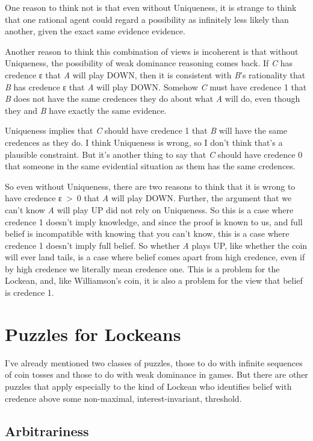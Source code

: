 \documentclass[
  10pt,
  letterpaper,
  twoside]{scrbook}
\begin{document}
One reason to think not is that even without Uniqueness, it is strange
to think that one rational agent could regard a possibility as
infinitely less likely than another, given the exact same evidence
evidence.

Another reason to think this combination of views is incoherent is that
without Uniqueness, the possibility of weak dominance reasoning comes
back. If \emph{C} has credence ε that \emph{A} will play DOWN, then it
is consistent with \emph{B}'s rationality that \emph{B} has credence ε
that \emph{A} will play DOWN. Somehow \emph{C} must have credence 1 that
\emph{B} does not have the same credences they do about what \emph{A}
will do, even though they and \emph{B} have exactly the same evidence.

Uniqueness implies that \emph{C} should have credence 1 that \emph{B}
will have the same credences as they do. I think Uniqueness is wrong, so
I don't think that's a plausible constraint. But it's another thing to
say that \emph{C} should have credence 0 that someone in the same
evidential situation as them has the same credences.

So even without Uniqueness, there are two reasons to think that it is
wrong to have credence ε~\textgreater~0 that \emph{A} will play DOWN.
Further, the argument that we can't know \emph{A} will play UP did not
rely on Uniqueness. So this is a case where credence 1 doesn't imply
knowledge, and since the proof is known to us, and full belief is
incompatible with knowing that you can't know, this is a case where
credence 1 doesn't imply full belief. So whether \emph{A} plays UP, like
whether the coin will ever land tails, is a case where belief comes
apart from high credence, even if by high credence we literally mean
credence one. This is a problem for the Lockean, and, like Williamson's
coin, it is also a problem for the view that belief is credence 1.

\section{Puzzles for Lockeans}\label{sec-lockepuzzles}

I've already mentioned two classes of puzzles, those to do with infinite
sequences of coin tosses and those to do with weak dominance in games.
But there are other puzzles that apply especially to the kind of Lockean
who identifies belief with credence above some non-maximal,
interest-invariant, threshold.

\subsection{Arbitrariness}\label{sec-lockearb}
\end{document}
